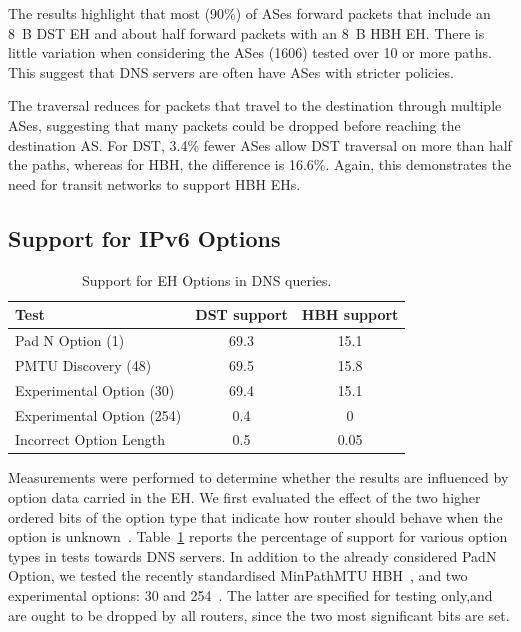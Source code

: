\documentclass[conference]{IEEEtran}
\begin{document}

The results highlight that most (90\%) of ASes forward packets that include an  8~B DST EH
 and about half forward packets with an
8~B HBH EH.  There is little variation when considering the ASes (1606) tested over 10 or more paths.  
This suggest that DNS servers are often have
ASes with stricter policies.

The traversal reduces for packets that travel to the destination
through multiple ASes, suggesting that many packets  could be
dropped before reaching the destination AS. For DST, 3.4\% fewer ASes
allow DST traversal on more than half the paths, whereas for HBH, the
difference is 16.6\%. Again, this demonstrates the need for  transit 
networks to support HBH EHs. 

\subsection{Support for IPv6 Options}

\begin{table}[t]
\centering 
\caption{Support for EH Options in DNS queries.}
\begin{tabular}{l|c|c}
Test                      & DST support & HBH support\\
\hline \hline
Pad N Option (1)          & 69.3        & 15.1       \\
PMTU Discovery (48)       & 69.5        & 15.8       \\
Experimental Option (30)  & 69.4        & 15.1       \\
Experimental Option (254) & 0.4         & 0          \\
Incorrect Option Length   & 0.5         & 0.05            
\end{tabular}
\label{tbl:option_type_support}
\end{table}

Measurements were performed to determine whether the results are 
influenced by option data carried in the EH.  We first
evaluated the effect of the two higher ordered bits of the option type
that indicate how router should behave when the option is unknown~\cite{RFC8200}.
Table~\ref{tbl:option_type_support} reports the percentage of support for various
option types in tests towards DNS servers.  In addition to the already
considered PadN Option, we tested the recently standardised MinPathMTU
HBH~\cite{rfc9268}, and two experimental options: 30 and
254~\cite{RFC4727}.  The latter are specified for testing
only,and are ought to be dropped by all routers, since the two most
significant bits are set.  
\end{document}
